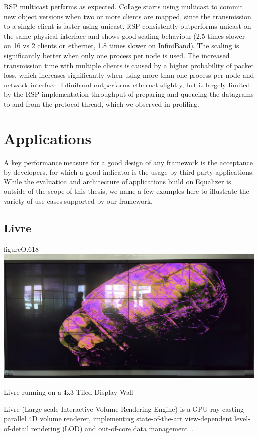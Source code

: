 RSP multicast performs as expected. Collage starts using multicast to commit
new object versions when two or more clients are mapped, since the transmission
to a single client is faster using unicast. RSP consistently outperforms
unicast on the same physical interface and shows good scaling behaviour (2.5
times slower on 16 vs 2 clients on ethernet, 1.8 times slower on InfiniBand).
The scaling is significantly better when only one process per node is used. The
increased transmission time with multiple clients is caused by a higher
probability of packet loss, which increases significantly when using more than
one process per node and network interface. Infiniband outperforms ethernet
slightly, but is largely limited by the RSP implementation throughput of
preparing and queueing the datagrams to and from the protocol thread, which we
observed in profiling.


\chapter{Applications}\label{sApplications}

A key performance measure for a good design of any framework is the acceptance
by developers, for which a good indicator is the usage by third-party
applications. While the evaluation and architecture of applications build on
Equalizer is outside of the scope of this thesis, we name a few examples here
to illustrate the variety of use cases supported by our framework.

\section{Livre}

\begin{wrapfloat}{figure}{O}{.618\textwidth}
  \includegraphics[width=.618\textwidth]{images/livre}
  {\caption{\label{fLivre}Livre running on a 4x3 Tiled Display Wall}}
\end{wrapfloat}

Livre (Large-scale Interactive Volume Rendering Engine) is a GPU ray-casting
parallel 4D volume renderer, implementing state-of-the-art view-dependent
level-of-detail rendering (LOD) and out-of-core data
management~\cite{EHKRW:06}.

